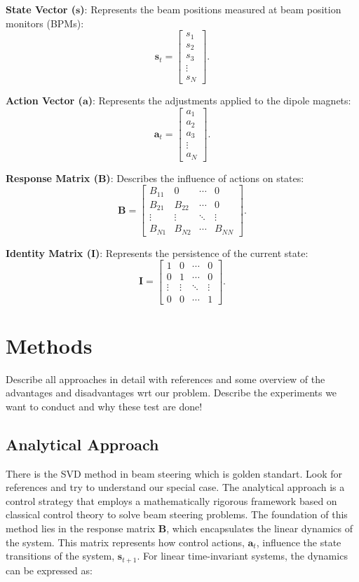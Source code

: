 \documentclass[journal,article,submit,pdftex,moreauthors]{Definitions/mdpi}
\begin{document}
\textbf{State Vector (\( \mathbf{s} \))}: Represents the beam positions measured at beam position monitors (BPMs):
	\[
	\mathbf{s}_t =
	\begin{bmatrix}
		s_1 \\
		s_2 \\
		s_3 \\
		\vdots \\
		s_N
	\end{bmatrix}.
	\]
	
\textbf{Action Vector (\( \mathbf{a} \))}: Represents the adjustments applied to the dipole magnets:
	\[
	\mathbf{a}_t =
	\begin{bmatrix}
		a_1 \\
		a_2 \\
		a_3 \\
		\vdots \\
		a_N
	\end{bmatrix}.
	\]
	
\textbf{Response Matrix (\( \mathbf{B} \))}: Describes the influence of actions on states:
	\[
	\mathbf{B} =
	\begin{bmatrix}
		B_{11} & 0 & \cdots & 0 \\
		B_{21} & B_{22} & \cdots & 0 \\
		\vdots & \vdots & \ddots & \vdots \\
		B_{N1} & B_{N2} & \cdots & B_{NN}
	\end{bmatrix}.
	\]
	
\textbf{Identity Matrix (\( \mathbf{I} \))}: Represents the persistence of the current state:
	\[
	\mathbf{I} =
	\begin{bmatrix}
		1 & 0 & \cdots & 0 \\
		0 & 1 & \cdots & 0 \\
		\vdots & \vdots & \ddots & \vdots \\
		0 & 0 & \cdots & 1
	\end{bmatrix}.
	\]
\section{Methods}

Describe all approaches in detail with references and some overview of the advantages and disadvantages wrt our problem.
Describe the experiments we want to conduct and why these test are done!
\subsection{Analytical Approach}
There is the SVD method in beam steering which is golden standart. Look for references and try to understand our special case.
The analytical approach is a control strategy that employs a mathematically rigorous framework based on classical control theory to solve beam steering problems. The foundation of this method lies in the response matrix $\mathbf{B}$, which encapsulates the linear dynamics of the system. This matrix represents how control actions, $\mathbf{a}_t$, influence the state transitions of the system, $\mathbf{s}_{t+1}$. For linear time-invariant systems, the dynamics can be expressed as:
\end{document}
